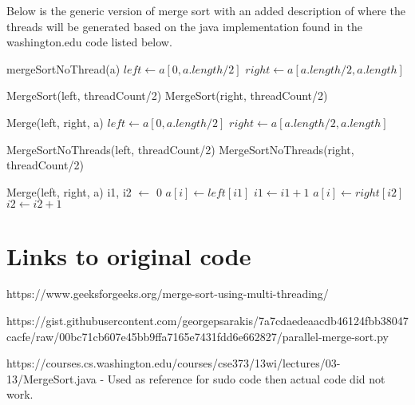 \documentclass{article}
\begin{document}
Below is the generic version of merge sort with an added description of where the threads will be generated based on the java implementation found in the washington.edu code listed below.

\begin{algorithm}
\begin{algorithmic}
			\State mergeSortNoThread(a)
			\State $left \gets a[0, a.length/2]$
			\State $right \gets a[a.length/2, a.length]$
			
			\State MergeSort(left, threadCount/2) 
			\State MergeSort(right, threadCount/2) 
			
			\State Merge(left, right, a)
		\EndIf
	\EndProcedure
			\State $left \gets a[0, a.length/2]$
			\State $right \gets a[a.length/2, a.length]$
			
			\State MergeSortNoThreads(left, threadCount/2)
			\State MergeSortNoThreads(right, threadCount/2) 
			
			\State Merge(left, right, a)
		\EndIf
	\EndProcedure
	\State i1, i2 $\gets$ 0
			\State $a[i] \gets left[i1] $
			\State $i1 \gets i1 + 1$
		\Else
			\State $a[i] \gets right[i2]$
			\State $i2 \gets i2+1$
		\EndIf
	\EndFor
	\EndProcedure
\end{algorithmic}
\end{algorithm}

\section{Links to original code}

https://www.geeksforgeeks.org/merge-sort-using-multi-threading/\newline

https://gist.githubusercontent.com/georgepsarakis/7a7cdaedeaacdb46124fbb38047cacfe/raw/00bc71cb607e45bb9ffa7165e7431fdd6e662827/parallel-merge-sort.py\newline

https://courses.cs.washington.edu/courses/cse373/13wi/lectures/03-13/MergeSort.java - Used as reference for sudo code then actual code did not work.
\end{document}

